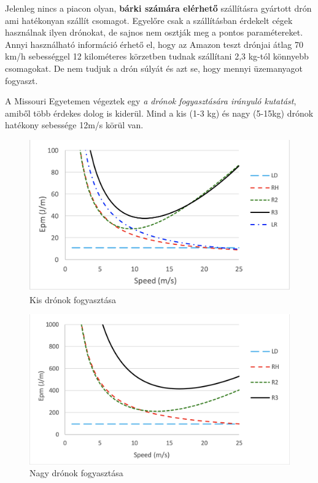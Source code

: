 Jelenleg nincs a piacon olyan, \textbf{bárki számára elérhető} szállításra gyártott drón ami hatékonyan szállít csomagot. Egyelőre csak a szállításban
érdekelt cégek használnak ilyen drónokat, de sajnos nem osztják meg a pontos paramétereket. Annyi használható
információ érhető el, hogy az Amazon teszt drónjai átlag 70 km/h sebességgel 12 kilométeres körzetben tudnak szállítani
2,3 kg-tól könnyebb csomagokat.
De nem tudjuk a drón súlyát és azt se, hogy mennyi üzemanyagot fogyaszt.

A Missouri Egyetemen végeztek egy \textit{a drónok fogyasztására irányuló kutatást}\cite{dron-szallitas-kutatas},
amiből több érdekes dolog is kiderül. Mind a kis (1-3 kg) és nagy (5-15kg) drónok hatékony sebessége  12m/s körül van.

\begin{figure}[h]
    \centering
    \includegraphics[scale=0.4]{images/fogyasztas-kis-dronok.png}
    \caption{Kis drónok fogyasztása}
    \label{fig:kis}
\end{figure}


\begin{figure}[h]
    \centering
    \includegraphics[scale=0.4]{images/fogyasztas-nagy-dronok.png}
    \caption{Nagy drónok fogyasztása}
    \label{fig:nagy}
\end{figure}

